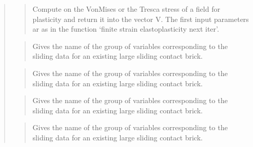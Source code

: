 \documentclass[a4paper,11pt,english]{sphinxmanual}
\begin{document}
\begin{quote}
\sphinxAtStartPar
{}
\begin{quote}

\sphinxAtStartPar
Compute on  the Von\sphinxhyphen{}Mises or the Tresca stress of a field for plasticity and return it into the vector V.
The first input parameters ar as in the function ‘finite strain elastoplasticity next iter’.
\end{quote}

\sphinxAtStartPar
{}
\begin{quote}

\sphinxAtStartPar
Gives the name of the group of variables corresponding to the
sliding data for an existing large sliding contact brick.
\end{quote}

\sphinxAtStartPar
{}
\begin{quote}

\sphinxAtStartPar
Gives the name of the group of variables corresponding to the
sliding data for an existing large sliding contact brick.
\end{quote}

\sphinxAtStartPar
{}
\begin{quote}

\sphinxAtStartPar
Gives the name of the group of variables corresponding to the
sliding data for an existing large sliding contact brick.
\end{quote}

\sphinxAtStartPar
{}
\begin{quote}

\sphinxAtStartPar
Gives the name of the group of variables corresponding to the
sliding data for an existing large sliding contact brick.
\end{quote}


\end{quote}
\end{document}
